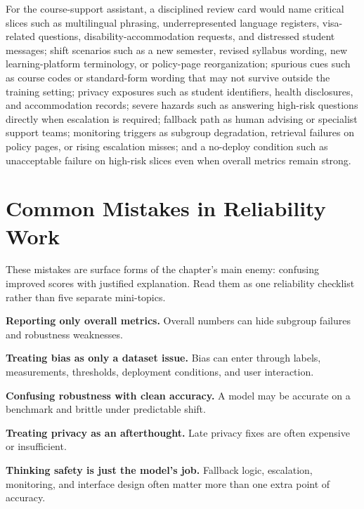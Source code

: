 \begin{example}
For the course-support assistant, a disciplined review card would name critical slices such as multilingual phrasing, underrepresented language registers, visa-related questions, disability-accommodation requests, and distressed student messages; shift scenarios such as a new semester, revised syllabus wording, new learning-platform terminology, or policy-page reorganization; spurious cues such as course codes or standard-form wording that may not survive outside the training setting; privacy exposures such as student identifiers, health disclosures, and accommodation records; severe hazards such as answering high-risk questions directly when escalation is required; fallback path as human advising or specialist support teams; monitoring triggers as subgroup degradation, retrieval failures on policy pages, or rising escalation misses; and a no-deploy condition such as unacceptable failure on high-risk slices even when overall metrics remain strong.
\end{example}

\section{Common Mistakes in Reliability Work}

These mistakes are surface forms of the chapter's main enemy: confusing improved scores with justified explanation. Read them as one reliability checklist rather than five separate mini-topics.

\begin{mistakebox}
\item \textbf{Reporting only overall metrics.} Overall numbers can hide subgroup failures and robustness weaknesses.
\item \textbf{Treating bias as only a dataset issue.} Bias can enter through labels, measurements, thresholds, deployment conditions, and user interaction.
\item \textbf{Confusing robustness with clean accuracy.} A model may be accurate on a benchmark and brittle under predictable shift.
\item \textbf{Treating privacy as an afterthought.} Late privacy fixes are often expensive or insufficient.
\item \textbf{Thinking safety is just the model's job.} Fallback logic, escalation, monitoring, and interface design often matter more than one extra point of accuracy.
\end{mistakebox}

